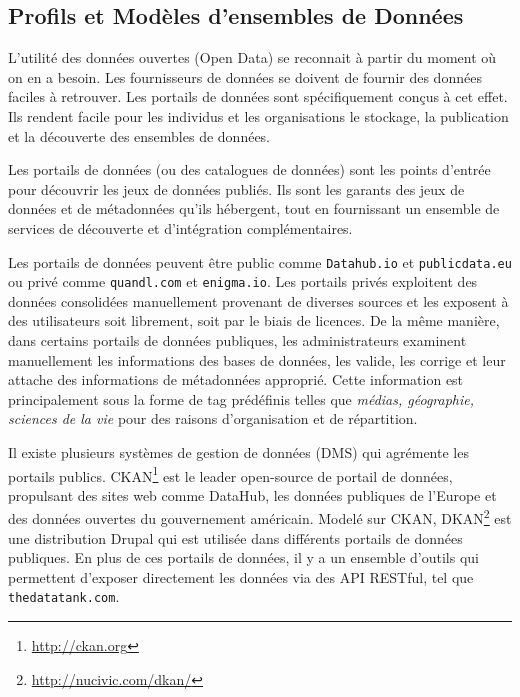 
\subsection{Profils et Mod\`{e}les d'ensembles de Donn\'{e}es}

L'utilit\'{e} des donn\'{e}es ouvertes (Open Data) se reconnait \`{a} partir du moment o\`{u} on en a besoin. Les fournisseurs de donn\'{e}es se doivent de fournir des donn\'{e}es faciles \`{a} retrouver. Les portails de donn\'{e}es sont sp\'{e}cifiquement conçus \`{a} cet effet. Ils rendent facile pour les individus et les organisations le stockage, la publication et la d\'{e}couverte des ensembles de donn\'{e}es.

Les portails de donn\'{e}es (ou des catalogues de donn\'{e}es) sont les points d'entr\'{e}e pour d\'{e}couvrir les jeux de donn\'{e}es publi\'{e}s. Ils sont les garants des jeux de donn\'{e}es et de m\'{e}tadonn\'{e}es qu'ils h\'{e}bergent, tout en fournissant un ensemble de services de d\'{e}couverte et d'int\'{e}gration compl\'{e}mentaires.

Les portails de donn\'{e}es peuvent \^{e}tre public comme \texttt{Datahub.io} et \texttt{publicdata.eu} ou priv\'{e} comme \texttt{quandl.com} et \texttt{enigma.io}. Les portails priv\'{e}s exploitent des donn\'{e}es consolid\'{e}es manuellement provenant de diverses sources et les exposent \`{a} des utilisateurs soit librement, soit par le biais de licences. De la m\^{e}me mani\`{e}re, dans certains portails de donn\'{e}es publiques, les administrateurs examinent manuellement les informations des bases de donn\'{e}es, les valide, les corrige et leur attache des informations de m\'{e}tadonn\'{e}es appropri\'{e}. Cette information est principalement sous la forme de tag pr\'{e}d\'{e}finis telles que \textit{m\'{e}dias, g\'{e}ographie, sciences de la vie} pour des raisons d'organisation et de r\'{e}partition.

Il existe plusieurs syst\`{e}mes de gestion de donn\'{e}es (DMS) qui agr\'{e}mente les portails publics. CKAN\footnote{\url{http://ckan.org}} est le leader open-source de portail de donn\'{e}es, propulsant des sites web comme DataHub, les donn\'{e}es publiques de l'Europe et des donn\'{e}es ouvertes du gouvernement am\'{e}ricain. Model\'{e} sur CKAN, DKAN\footnote{\url{http://nucivic.com/dkan/}} est une distribution Drupal qui est utilis\'{e}e dans diff\'{e}rents portails de donn\'{e}es publiques. En plus de ces portails de donn\'{e}es, il y a un ensemble d'outils qui permettent d'exposer directement les donn\'{e}es via des API RESTful, tel que \texttt{thedatatank.com}.

